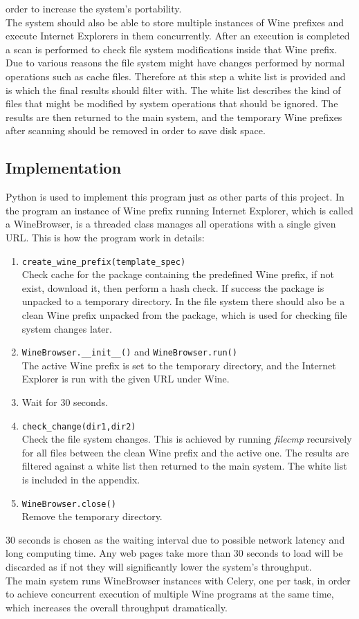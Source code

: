order to increase the system's portability. \\
The system should also be able to store multiple instances of Wine prefixes 
and execute Internet Explorers in them concurrently. 
After an execution is completed a scan is performed to check file system 
modifications inside that Wine prefix. 
Due to various reasons the file system might have changes performed by normal 
operations such as cache files. 
Therefore at this step a white list is provided and is which the final 
results should filter with. The white list describes the kind of 
files that might be modified by system operations that should be ignored. 
The results are then returned to the main system, and the temporary Wine 
prefixes after scanning should be removed in order to save disk space. 

\subsection{Implementation}
Python is used to implement this program just as other parts of this project. 
In the program an instance of Wine prefix running Internet Explorer, which is called 
a WineBrowser, is a threaded class manages all operations with a single 
given URL. This is how the program work in details:
\begin{enumerate}
\item \verb`create_wine_prefix(template_spec)` \\
Check cache for the package containing the predefined Wine prefix, if not 
exist, download it, then perform a hash check.
If success the package is unpacked to a temporary directory. 
In the file system there should also be a clean Wine prefix unpacked from the 
package, which is used for checking file system changes later. 
\item \verb`WineBrowser.__init__()` and \verb`WineBrowser.run()`\\
The active Wine prefix is set to the temporary directory, and the Internet 
Explorer is run with the given URL under Wine. 
\item
Wait for 30 seconds.
\item \verb`check_change(dir1,dir2)`\\
Check the file system changes. This is achieved by running {\em filecmp} recursively 
for all files between the clean Wine prefix and the active one. The results 
are filtered against a white list then returned to the main system. The white 
list is included in the appendix.%
\item \verb`WineBrowser.close()`\\
Remove the temporary directory. 
\end{enumerate}
30 seconds is chosen as the waiting interval due to possible network 
latency and long computing time. Any web pages take more than 30 seconds to 
load will be discarded as if not they will significantly lower the system's 
throughput. \\
The main system runs WineBrowser instances with Celery, one per task, in order 
to achieve concurrent execution of multiple Wine programs at the same time, 
which increases the overall throughput dramatically. 
